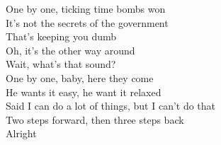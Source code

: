 One by one, ticking time bombs won \\
It's not the secrets of the government \\
That's keeping you dumb \\
Oh, it's the other way around \\
Wait, what's that sound? \\
One by one, baby, here they come \\

He wants it easy, he want it relaxed \\
Said I can do a lot of things, but I can't do that \\
Two steps forward, then three steps back \\
Alright \\
